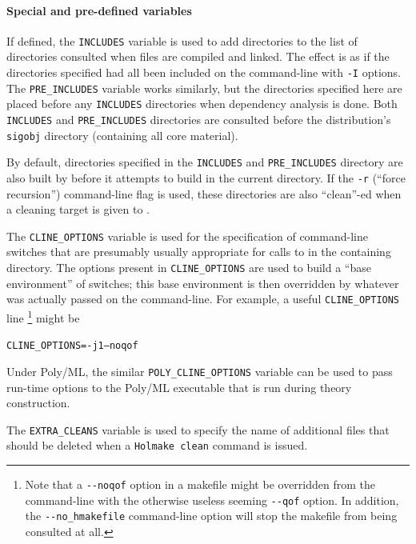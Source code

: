 \paragraph{Special and pre-defined variables}

If defined, the \texttt{INCLUDES} variable is used to add directories to the list of directories consulted when files are compiled and linked.
The effect is as if the directories specified had all been included on the command-line with \texttt{-I} options.
The \texttt{PRE\_INCLUDES} variable works similarly, but the directories specified here are placed before any \texttt{INCLUDES} directories when dependency analysis is done.
Both \texttt{INCLUDES} and \texttt{PRE\_INCLUDES} directories are consulted before the distribution's \texttt{sigobj} directory (containing all core material).

By default, directories specified in the \texttt{INCLUDES} and \texttt{PRE\_INCLUDES} directory are also built by \holmake{} before it attempts to build in the current directory.
If the \texttt{-r} (``force recursion'') command-line flag is used, these directories are also ``clean''-ed when a cleaning target is given to \holmake{}.

%
The \texttt{CLINE\_OPTIONS} variable is used for the specification of command-line switches that are presumably usually appropriate for calls to \holmake{} in the containing directory.
The options present in \texttt{CLINE\_OPTIONS} are used to build a ``base environment'' of switches; this base environment is then overridden by whatever was actually passed on the command-line.
For example, a useful \texttt{CLINE\_OPTIONS} line%
\footnote{Note that a \texttt{-{}-noqof} option in a makefile might be overridden from the command-line with the otherwise useless seeming \texttt{-{}-qof} option.
In addition, the \texttt{-{}-no\_hmakefile} command-line option will stop the makefile from being consulted at all.} %
might be
\begin{alltt}
    CLINE_OPTIONS = -j1 --noqof
\end{alltt}
Under Poly/ML, the similar \texttt{POLY\_CLINE\_OPTIONS} variable can be used to pass run-time options to the Poly/ML executable that is run during theory construction.


%
The \texttt{EXTRA\_CLEANS} variable is used to
specify the name of additional files that should be deleted when a
\texttt{Holmake clean} command is issued.

